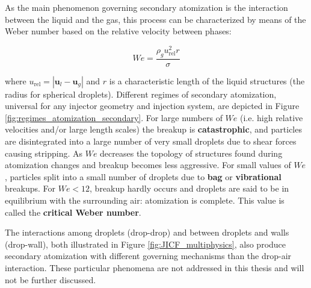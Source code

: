 \begin{itemize}
	As the main phenomenon governing secondary atomization is the interaction between the liquid and the gas, this process can be characterized by means of the Weber number based on the relative velocity between phases:
	
	\begin{equation}
	We = \frac{\rho_g u_\mathrm{rel}^2 r}{\sigma} 
	\end{equation}
	
	where $u_\mathrm{rel} = | \textbf{u}_l - \textbf{u}_g  |$ and $r$ is a characteristic length of the liquid structures (the radius for spherical droplets). Different regimes of secondary atomization, universal for any injector geometry and injection system, are depicted in Figure \ref{fig:regimes_atomization_secondary}. For large numbers of $We$ (i.e. high relative velocities and/or large length scales) the breakup is \textbf{catastrophic}, and particles are disintegrated into a large number of very small droplets due to shear forces causing stripping. As $We$ decreases the topology of structures found during atomization changes and breakup becomes less aggressive. For small values of $We$, particles split into a small number of droplets due to \textbf{bag} or \textbf{vibrational} breakups. For $We < 12$, breakup hardly occurs and droplets are said to be in equilibrium with the surrounding air: atomization is complete. This value is called the \textbf{critical Weber number}. 
	
	The interactions among droplets (drop-drop) and between droplets and walls (drop-wall), both illustrated in Figure \ref{fig:JICF_multiphysics}, also produce secondary atomization with different governing mechanisms than the drop-air interaction. These particular phenomena are not addressed in this thesis and will not be further discussed.
	

\end{itemize}
